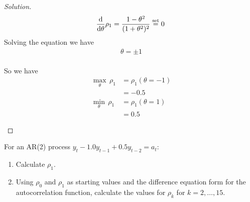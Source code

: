 \documentclass[UTF8,a4paper,14pt]{ctexart}
\newenvironment{solution}
  {\renewcommand\qedsymbol{$\blacksquare$}\begin{proof}[Solution]}
  {\end{proof}}
\theoremstyle{definition}
\theoremstyle{remark}
\begin{document}
\begin{solution}
\begin{equation}
  \begin{aligned}
    \dv{}{\theta}\rho_1 =\frac{1-\theta^2}{(1+\theta^2)^2}
    &\overset{\text{set}}{=}0\\
  \end{aligned}
\end{equation}
Solving the equation we have
\begin{equation}\
  \begin{aligned}
    \theta = \pm 1\\
  \end{aligned}
\end{equation}

So we have
\begin{equation}\
  \begin{aligned}
    \underset{\theta}{\max}\,\rho_1 &= \rho_1(\theta = -1)\\ &= -0.5\\
    \underset{\theta}{\min}\,\rho_1 &= \rho_1(\theta = 1)\\ &= 0.5
  \end{aligned}
\end{equation}

\begin{center}
\end{center}

\end{solution}
\pagebreak
\begin{Problem}{}
    For an AR(2) process \(y_t -1.0 y_{t-1} +0.5 y_{t-2} = a_{t}\):
    \begin{enumerate}
        \item Calculate \(\rho_1\).
        \item Using \(\rho_0\) and \(\rho_1\) as starting values and the difference equation form for the autocorrelation function, calculate the values for \(\rho_{k}\) for \(k = 2,\ldots,15\).
    \end{enumerate}
  \end{Problem}
\end{document}
